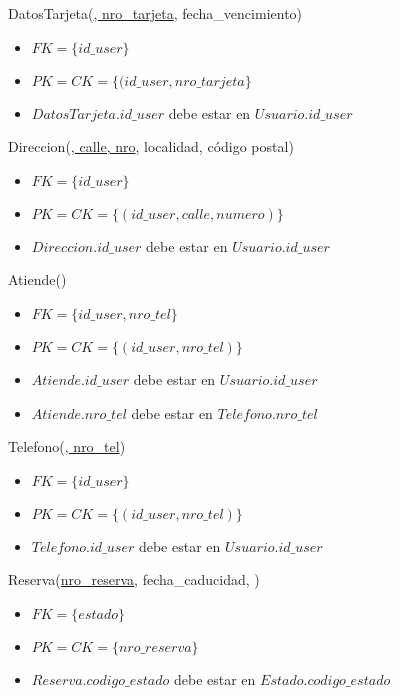 \vspace*{0.5cm}
\noindent
DatosTarjeta(\underline{, nro\_tarjeta}, fecha\_vencimiento)
\begin{itemize}
	\item $FK = \{id\_user\}$
	\item $PK = CK = \{(id\_user, nro\_tarjeta\}$
	\item $DatosTarjeta.id\_user$ debe estar en $Usuario.id\_user$
\end{itemize}


\vspace*{0.5cm}
\noindent
Direccion(\underline{, calle, nro}, localidad,
					código postal)
\begin{itemize}
	\item $FK = \{id\_user\}$
	\item $PK = CK = \{(id\_user, calle, numero)\}$
	\item $Direccion.id\_user$ debe estar en $Usuario.id\_user$
\end{itemize}

\vspace*{0.5cm}
\noindent
Atiende(\underline{})
\begin{itemize}
	\item $FK = \{id\_user, nro\_tel\}$
	\item $PK = CK = \{(id\_user, nro\_tel)\}$
	\item $Atiende.id\_user$ debe estar en $Usuario.id\_user$
	\item $Atiende.nro\_tel$ debe estar en $Telefono.nro\_tel$
\end{itemize}

\vspace*{0.5cm}
\noindent
Telefono(\underline{, nro\_tel})
\begin{itemize}
	\item $FK = \{id\_user\}$
	\item $PK = CK = \{(id\_user, nro\_tel)\}$
	\item $Telefono.id\_user$ debe estar en $Usuario.id\_user$
\end{itemize}


\vspace*{0.5cm}
\noindent
Reserva(\underline{nro\_reserva}, fecha\_caducidad, )
\begin{itemize}
	\item $FK = \{estado\}$
	\item $PK = CK = \{nro\_reserva\}$
	\item $Reserva.codigo\_estado$ debe estar en $Estado.codigo\_estado$
\end{itemize}


